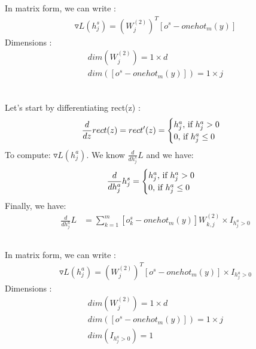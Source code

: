\documentclass[12pt]{article}
\begin{document}
\subsection{}
In matrix form, we can write :
\begin{align*}
\triangledown L(h^s_j) =(W^{(2)}_j)^T [o^s - onehot_m(y)]
\end{align*}
Dimensions :
\begin{align*}
dim(W^{(2)}_j ) = 1 \times d \\
dim([o^s - onehot_m(y)]) = 1 \times j \\
\end{align*}
\subsection{}
Let's start by differentiating rect(z) :
\begin{align*}
\frac{d}{dz} {rect(z)} = rect'(z) = \begin{cases}
               h^a_j$, if $ h^a_j > 0 \\
               0$, if $ h^a_j \leq 0  \\
            \end{cases} 
\end{align*}
To compute: $\triangledown L(h^a_j)$.
We know $\frac{d}{dh^s_j} L$ and we have:
\begin{align*}
\frac{d}{dh^a_j} {h^s_j} &=  \begin{cases}
               h^a_j$, if $ h^a_j > 0 \\
               0$, if $ h^a_j \leq 0  \\
            \end{cases}  \\
\end{align*}
Finally, we have:
\begin{align*}
\frac{d}{dh^a_j} L & = \sum\limits_{k=1}^m [o^s_k - onehot_m(y)]  W^{(2)}_{k,j} \times I_{h^a_j > 0}
\end{align*}
\subsection{}
In matrix form, we can write :
\begin{align*}
\triangledown L(h^a_j) =(W^{(2)}_j)^T [o^s - onehot_m(y)] \times I_{h^a_j > 0}
\end{align*}
Dimensions :
\begin{align*}
dim(W^{(2)}_j ) = 1 \times d \\
dim([o^s - onehot_m(y)]) = 1 \times j \\
dim(I_{h^a_j > 0}) = 1 
\end{align*}
\end{document}
